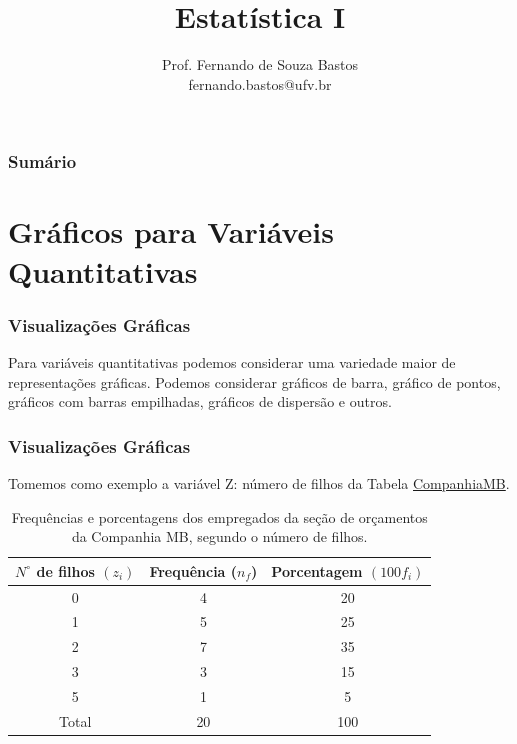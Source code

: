 \documentclass[14pt,aspectratio=1610]{beamer}
\title{Estatística I}
\author{Prof. Fernando de Souza Bastos \texorpdfstring{\\ fernando.bastos@ufv.br}{}}
\institute{Departamento de Estatística \texorpdfstring{\\ Universidade Federal de Viçosa}{}\texorpdfstring{\\ Campus UFV - Viçosa}{}}
\date{}
\begin{document}
%

\frame{\titlepage}

\begin{frame}{}
\frametitle{\bf Sumário}
\tableofcontents
\end{frame}

\section{Gráficos para Variáveis Quantitativas}
\begin{frame}{}
\frametitle{Visualizações Gráficas}
\begin{block}{}
\justifying
Para variáveis quantitativas podemos considerar uma variedade maior de representações gráficas. Podemos considerar gráficos de barra, gráfico de pontos, gráficos com barras empilhadas, gráficos de dispersão e outros.  
\end{block}
\nocite{Apostila}
\end{frame}

\begin{frame}{}
\frametitle{Visualizações Gráficas}
\begin{block}{}
	\footnotesize
\justifying
Tomemos como exemplo a variável Z: número de filhos da Tabela \href{https://raw.githack.com/ufvest/ufvest.github.io/master/Aulas_EST105/CompanhiaMB.html}{CompanhiaMB}.
\begin{table}[ht]
\centering
\caption{Frequências e porcentagens dos
empregados da seção de orçamentos
da Companhia MB, segundo
o número de filhos.}
\begin{tabular}{c|c|c}
  \hline
 $N^{\circ}$ de filhos $(z_{i})$ & Frequência ($n_{f}$) & Porcentagem $(100f_{i})$ \\ 
  \hline
  0 & 4 & 20 \\ 
  1 & 5 & 25 \\ 
  2 & 7 & 35 \\ 
  3 & 3 & 15 \\ 
  5 & 1 & 5  \\ 
  \hline
Total& 20 & 100\\
\hline
\end{tabular}
\end{table}
\end{block}
\end{frame}
\end{document}
